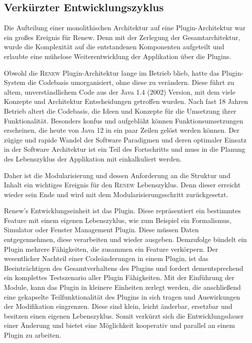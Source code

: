 	\subsection{Verkürzter Entwicklungszyklus}\label{sub:vez}
		Die Aufteilung einer monolithischen Architektur auf eine Plugin-Architektur war ein großes Ereignis für Renew. Denn mit der Zerlegung der Gesamtarchitektur, wurde die Komplexität auf die entstandenen Komponenten aufgeteilt und erlaubte eine mühelose Weiterentwicklung der Applikation über die Plugins. \bigbreak

		Obwohl die \textsc{Renew} Plugin-Architektur lange im Betrieb blieb, hatte das Plugin-System die Codebasis umorganisiert, ohne diese zu verändern. Diese führt zu altem, unverständlichem Code aus der Java 1.4 (2002) Version, mit dem viele Konzepte und Architektur Entscheidungen getroffen wurden. Nach fast 18 Jahren Betrieb altert die Codebasis, die Ideen und Konzepte für die Umsetzung ihrer Funktionalität. Besonders konfus und aufgebläht können Funktionsumsetzungen erscheinen, die heute von Java 12 in ein paar Zeilen gelöst werden können. Der zügige und rapide Wandel der Software Paradigmen und deren optimaler Einsatz in der Software Architektur ist ein Teil des Fortschritts und muss in die Planung des Lebenszyklus der Applikation mit einkalkuliert werden. \newline

		Daher ist die Modularisierung und dessen Anforderung an die Struktur und Inhalt ein wichtiges Ereignis für den \textsc{Renew} Lebenszyklus. Denn dieser erreicht wieder sein Ende und wird mit dem Modularisierungsschritt zurückgesetzt. \bigbreak

		Renew's Entwicklungseinheit ist das Plugin. Diese repräsentiert ein bestimmtes Feature mit einem eigenen Lebenszyklus, wie zum Beispiel ein Formalismus, Simulator oder Fenster Management Plugin. Diese müssen Daten entgegennehmen, diese verarbeiten und wieder ausgeben. Demzufolge bündelt ein Plugin mehrere Fähigkeiten, die zusammen ein Feature verkörpern. Der wesentlicher Nachteil einer Codeänderungen in einem Plugin, ist das Beeinträchtigen des Gesamtverhaltens des Plugins und fordert dementsprechend ein komplettes Testszenario aller Plugin Fähigkeiten.\newline
		Mit der Einführung der Module, kann das Plugin in kleinere Einheiten zerlegt werden, die anschließend eine gekapselte Teilfunktionalität des Plugins in sich tragen und Auswirkungen der Modifikation eingrenzen. Diese sind klein, leicht änderbar, ersetzbar und besitzen einen eigenen Lebenszyklus. Somit verkürzt sich die Entwicklungsdauer einer Änderung und bietet eine Möglichkeit kooperativ und parallel an einem Plugin zu arbeiten. \bigbreak

